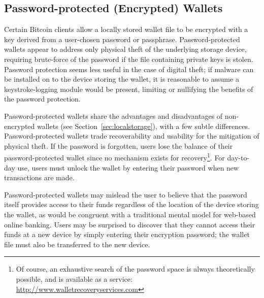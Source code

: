 \subsection{Password-protected (Encrypted) Wallets}
Certain Bitcoin clients allow a locally stored wallet file to be encrypted with a key derived from a user-chosen password or passphrase. 
Password-protected wallets appear to address only physical theft of the underlying storage device, requiring brute-force of the password if the file containing private keys is stolen. Password protection seems less useful in the case of digital theft; if malware can be installed on to the device storing the wallet, it is reasonable to assume a keystroke-logging module would be present, limiting or nullifying the benefits of the password protection.

Password-protected wallets share the advantages and disadvantages of non-encrypted wallets (see Section~\ref{sec:localstorage}), with a few subtle differences. Password-protected wallets trade recoverability and usability for the mitigation of physical theft. If the password is forgotten, users lose the balance of their password-protected wallet since no mechanism exists for recovery\footnote{Of course, an exhaustive search of the password space is always theoretically possible, and is available as a service: \url{http://www.walletrecoveryservices.com}}. For day-to-day use, users must unlock the wallet by entering their password when new transactions are made. 


Password-protected wallets may mislead the user to believe that the password itself provides access to their funds regardless of the location of the device storing the wallet, as would be congruent with a traditional mental model for web-based online banking. Users may be surprised to discover that they cannot access their funds at a new device by simply entering their encryption password; the wallet file must also be transferred to the new device. 

